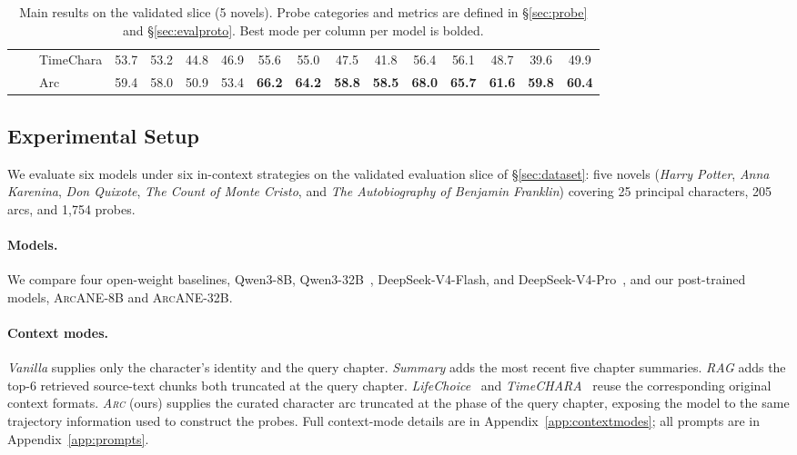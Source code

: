 \documentclass{llmxive}
\providecommand{\ours}{\textsc{ArcANE}}
\begin{document}
\begin{table}[!htbp]
\begin{tabular}{lllccccccccccccc}
 &  & TimeChara & 53.7 & 53.2 & 44.8 & 46.9 & 55.6 & 55.0 & 47.5 & 41.8 & 56.4 & 56.1 & 48.7 & 39.6 & 49.9 \\
 &  & \cellcolor{yellow!15} Arc & \cellcolor{yellow!15} 59.4 & \cellcolor{yellow!15} 58.0 & \cellcolor{yellow!15} 50.9 & \cellcolor{yellow!15} 53.4 & \cellcolor{yellow!15} \textbf{66.2} & \cellcolor{yellow!15} \textbf{64.2} & \cellcolor{yellow!15} \textbf{58.8} & \cellcolor{yellow!15} \textbf{58.5} & \cellcolor{yellow!15} \textbf{68.0} & \cellcolor{yellow!15} \textbf{65.7} & \cellcolor{yellow!15} \textbf{61.6} & \cellcolor{yellow!15} \textbf{59.8} & \cellcolor{yellow!15} \textbf{60.4} \\
\bottomrule
\end{tabular}
\caption{Main results on the validated slice (5 novels). Probe categories and metrics are defined in \S\ref{sec:probe} and \S\ref{sec:evalproto}. Best mode per column per model is bolded.}
\label{tab:main_results}
\end{table}



\subsection{Experimental Setup\label{sec:setup}}

We evaluate six models under six in-context strategies on the validated evaluation slice of \S\ref{sec:dataset}: five novels (\emph{Harry Potter}, \emph{Anna Karenina}, \emph{Don Quixote}, \emph{The Count of Monte Cristo}, and \emph{The Autobiography of Benjamin Franklin}) covering 25 principal characters, 205 arcs, and 1{,}754 probes.

\paragraph{Models.}
We compare four open-weight baselines, Qwen3-8B, Qwen3-32B~\cite{yang2025qwen3}, DeepSeek-V4-Flash, and DeepSeek-V4-Pro~\cite{deepseekai2026deepseekv4}, and our post-trained models, \ours{}-8B and \ours{}-32B.

\paragraph{Context modes.}
\emph{Vanilla} supplies only the character's identity and the query chapter. \emph{Summary} adds the most recent five chapter summaries. \emph{RAG} adds the top-6 retrieved source-text chunks both truncated at the query chapter. \emph{LifeChoice}~\cite{xu-etal-2025-characterisdestiny} and \emph{TimeCHARA}~\cite{ahn-etal-2024-timechara} reuse the corresponding original context formats. \emph{\textsc{Arc}} (ours) supplies the curated character arc truncated at the phase of the query chapter, exposing the model to the same trajectory information used to construct the probes. Full context-mode details are in Appendix~\ref{app:contextmodes}; all prompts are in Appendix~\ref{app:prompts}.
\end{document}
